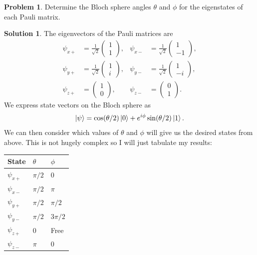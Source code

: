 \documentclass[10pt]{article}
\theoremstyle{definition}
\newtheorem{problem}{Problem}
\newtheorem{soln}{Solution}
\begin{document}
\begin{problem}
Determine the Bloch sphere angles $\theta$ and $\phi$ for the eigenstates of each Pauli matrix.
\end{problem}
\begin{soln}
  The eigenvectors of the Pauli matrices are
  \begin{align*}
    \psi_{x+} & = \frac{1}{\sqrt{2}} \begin{pmatrix} 1 \\  1 \end{pmatrix}, &
    \psi_{x-} & = \frac{1}{\sqrt{2}} \begin{pmatrix} 1 \\ -1 \end{pmatrix},   \\
    \psi_{y+} & = \frac{1}{\sqrt{2}} \begin{pmatrix} 1 \\  i \end{pmatrix}, &
    \psi_{y-} & = \frac{1}{\sqrt{2}} \begin{pmatrix} 1 \\ -i \end{pmatrix},   \\
    \psi_{z+} & =                  \begin{pmatrix} 1 \\  0 \end{pmatrix},   &
    \psi_{z-} & =                  \begin{pmatrix} 0 \\  1 \end{pmatrix}.
  \end{align*}
  We express state vectors on the Bloch sphere as
  $$\ket{\psi}=\cos(\theta/2)\ket{0}+e^{i\phi}\sin(\theta/2)\ket{1}.$$
  We can then consider which values of $\theta$ and $\phi$ will give us the desired states from above. This is not hugely complex so I will just tabulate my results:

  \begin{table}[ht!]
    \centering%
    \begin{tabular}{lll}
      \toprule
      State       & $\theta$ & $\phi$   \\
      \midrule
      $\psi_{x+}$ & $\pi/2$  & $0$      \\
      $\psi_{x-}$ & $\pi/2$  & $\pi$    \\
      $\psi_{y+}$ & $\pi/2$  & $\pi/2$  \\
      $\psi_{y-}$ & $\pi/2$  & $3\pi/2$ \\
      $\psi_{z+}$ & $0$      & Free     \\
      $\psi_{z-}$ & $\pi$    & $0$      \\
      \bottomrule
    \end{tabular}
  \end{table}
\end{soln}
\end{document}
